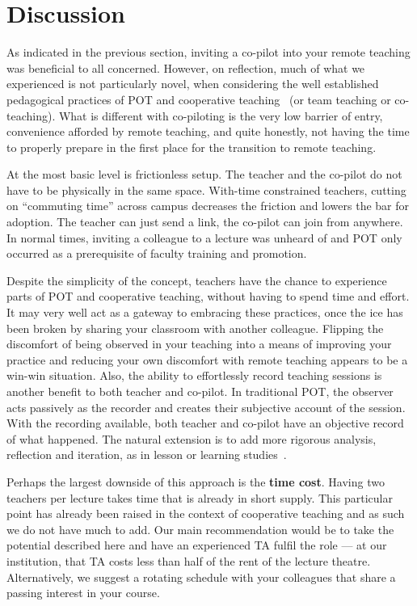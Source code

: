 \documentclass[sigconf,natbib=false]{acmart}
\begin{document}
\section{Discussion}

As indicated in the previous section, inviting a co-pilot into your remote 
teaching was beneficial to all concerned. However, on reflection, much of what 
we experienced is not particularly novel, when considering the well established 
pedagogical practices of \ac{POT} and cooperative 
teaching~\cite{bauwens1995cooperative} (or team teaching or co-teaching). What 
is different with co-piloting is the very low barrier of entry, convenience 
afforded by remote teaching, and quite honestly, not having the time to 
properly prepare in the first place for the transition to remote teaching.

At the most basic level is frictionless setup. The teacher and the co-pilot do 
not have to be physically in the same space. With-time constrained teachers, 
cutting on \enquote{commuting time} across campus decreases the friction and 
lowers the bar for adoption. The teacher can just send a link, the co-pilot can 
join from anywhere. In normal times, inviting a colleague to a lecture was 
unheard of and \ac{POT} only occurred as a prerequisite of faculty training and 
promotion.

Despite the simplicity of the concept, teachers have the chance to experience 
parts of \ac{POT} and cooperative teaching, without having to spend time and 
effort. It may very well act as a gateway to embracing these practices, once 
the ice has been broken by sharing your classroom with another colleague. 
Flipping the discomfort of being observed in your teaching into a means of 
improving your practice and reducing your own discomfort with remote teaching 
appears to be a win-win situation. Also, the ability to effortlessly record 
teaching sessions is another benefit to both teacher and co-pilot. In 
traditional \ac{POT}, the observer acts passively as the recorder and creates 
their subjective account of the session. With the recording available, both 
teacher and co-pilot have an objective record of what happened. The natural 
extension is to add more rigorous analysis, reflection and iteration, as in 
lesson or learning studies~\cite{NecessaryConditionsOfLearning}.

Perhaps the largest downside of this approach is the \textbf{time cost}. Having 
two teachers per lecture takes time that is already in short supply. This 
particular point has already been raised in the context of cooperative teaching 
and as such we do not have much to add. Our main recommendation would be to 
take the potential described here and have an experienced \ac{TA} fulfil the 
role --- at our institution, that \ac{TA} costs less than half of the rent of 
the lecture theatre.
Alternatively, we suggest a rotating schedule with your colleagues that share a 
passing interest in your course.
\end{document}

